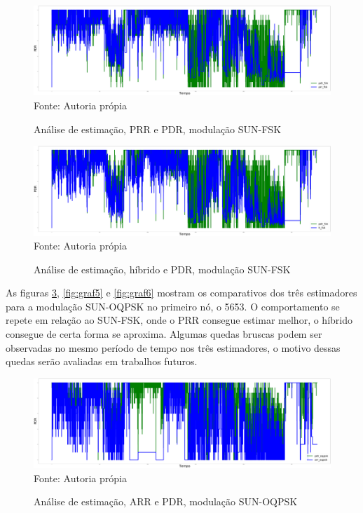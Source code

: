 \begin{figure}[H]
    \centering
    \caption{\footnotesize Análise de estimação, PRR e PDR, modulação SUN-FSK}
    \includegraphics[scale = 0.08]{sections/textual/Imagens/5653_prr_fsk.pdf}\\
    Fonte: Autoria própia
    \label{fig:graf2}
\end{figure}

\begin{figure}[H]
    \centering
    \caption{\footnotesize Análise de estimação, híbrido e PDR, modulação SUN-FSK}
    \includegraphics[scale = 0.08]{sections/textual/Imagens/5653_h_fsk.pdf}\\
    Fonte: Autoria própia
    \label{fig:graf3}
\end{figure}

\newpage
As figuras \ref{fig:graf4}, \ref{fig:graf5} e \ref{fig:graf6} mostram os comparativos dos três estimadores para a modulação SUN-OQPSK no primeiro nó, o 5653. O comportamento se repete em relação ao SUN-FSK, onde o PRR consegue estimar melhor, o híbrido consegue de certa forma se aproxima. Algumas quedas bruscas podem ser observadas no mesmo período de tempo nos três estimadores, o motivo dessas quedas serão avaliadas em trabalhos futuros. 

\begin{figure}[H]
    \centering
    \caption{\footnotesize Análise de estimação, ARR e PDR, modulação SUN-OQPSK}
    \includegraphics[scale = 0.08]{sections/textual/Imagens/5653_arr_oqpsk.pdf}\\
    Fonte: Autoria própia
    \label{fig:graf4}
\end{figure}

